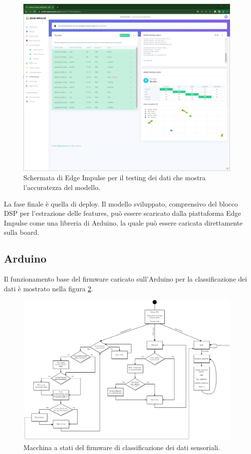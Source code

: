 \begin{figure}[h!]
	\centering
	\includegraphics[width=0.5\linewidth]{./ImageFiles/model_test.jpg}
	\caption{Schermata di Edge Impulse per il testing dei dati che mostra l'accuratezza del modello.}
	\label{fig:model_test}
\end{figure}

La fase finale è quella di deploy. Il modello sviluppato, comprensivo del blocco DSP per l'estrazione delle features, può essere scaricato dalla piattaforma Edge Impulse come una libreria di Arduino, la quale può essere caricata direttamente sulla board. 


\subsection{Arduino} \label{arduinoSect}
Il funzionamento base del firmware caricato sull'Arduino per la classificazione dei dati è mostrato nella figura \ref{fig:SM_classif}.
\begin{figure}[tbh]
	\centering
	\includegraphics[width=\linewidth]{./ImageFiles/SM_classification}
	\caption{Macchina a stati del firmware di classificazione dei dati sensoriali.}
	\label{fig:SM_classif}
\end{figure}

